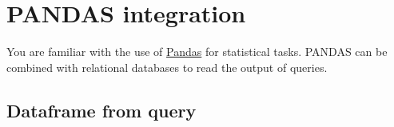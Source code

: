 \documentclass[slides]{pgnotes}
\begin{document}
  

\section{PANDAS integration}
\label{sec:pandas-integration}

You are familiar with the use of
\href{https://pandas.pydata.org/}{Pandas} for statistical tasks. PANDAS
can be combined with relational databases to read the output of queries.

\subsection{Dataframe from query}\label{sec:dataframe-from-query}

\inputminted{python}{dataframe_from_query.py}
\end{document}

